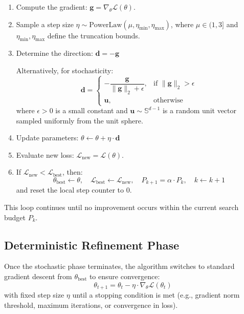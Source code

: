 \documentclass{article}
\begin{document}
\begin{enumerate}
    \item Compute the gradient: \( \mathbf{g} = \nabla_\theta \mathcal{L}(\theta) \).
    
    \item Sample a step size \( \eta \sim \text{PowerLaw}(\mu, \eta_{\min}, \eta_{\max}) \), where \( \mu \in (1, 3] \) and \( \eta_{\min}, \eta_{\max} \) define the truncation bounds.
    
    \item Determine the direction: $\mathbf{d} = -\mathbf{g}$

    Alternatively, for stochasticity:
    \[
    \mathbf{d} =
    \begin{cases}
        -\dfrac{\mathbf{g}}{\|\mathbf{g}\|_2 + \epsilon}, & \text{if } \|\mathbf{g}\|_2 > \epsilon \\
        \mathbf{u}, & \text{otherwise}
    \end{cases}
    \]
    where \( \epsilon > 0 \) is a small constant and \( \mathbf{u} \sim \mathbb{S}^{d-1} \) is a random unit vector sampled uniformly from the unit sphere.
   
    
    \item Update parameters: $\theta \leftarrow \theta + \eta \cdot \mathbf{d}$
    
    \item Evaluate new loss: \( \mathcal{L}_{\text{new}} = \mathcal{L}(\theta) \).
    
    \item If \( \mathcal{L}_{\text{new}} < \mathcal{L}_{\text{best}} \), then:
    \[
    \theta_{\text{best}} \leftarrow \theta, \quad \mathcal{L}_{\text{best}} \leftarrow \mathcal{L}_{\text{new}}, \quad P_{k+1} = \alpha \cdot P_k, \quad k \leftarrow k+1
    \]
    and reset the local step counter to 0.
\end{enumerate}

This loop continues until no improvement occurs within the current search budget \( P_k \).

\subsection{Deterministic Refinement Phase}
Once the stochastic phase terminates, the algorithm switches to standard gradient descent from \( \theta_{\text{best}} \) to ensure convergence:
\[
\theta_{t+1} = \theta_t - \eta \cdot \nabla_\theta \mathcal{L}(\theta_t)
\]
with fixed step size \( \eta \) until a stopping condition is met (e.g., gradient norm threshold, maximum iterations, or convergence in loss).
\end{document}
